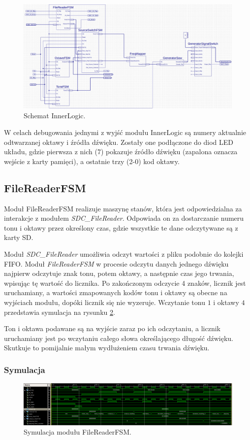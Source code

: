 \documentclass[a4paper,12pt]{article}
\begin{document}
\begin{figure}[h]
  \centering
  \includegraphics[width=\linewidth]{images/inner}
  \caption{Schemat InnerLogic.}
  \label{sch:inner}
\end{figure}

W celach debugowania jednymi z wyjść modułu InnerLogic są numery aktualnie odtwarzanej oktawy i źródła dźwięku. Zostały one podłączone do diod LED układu, gdzie pierwsza z nich (7) pokazuje źródło dźwięku (zapalona oznacza wejście z karty pamięci), a ostatnie trzy (2-0) kod oktawy. 

\subsection{FileReaderFSM}

Moduł FileReaderFSM realizuje maszynę stanów, która jest odpowiedzialna za interakcje z modułem \textit{SDC\_FileReader}. Odpowiada on za dostarczanie numeru tonu i oktawy przez określony czas, gdzie wszystkie te dane odczytywane są z karty SD.

Moduł \textit{SDC\_FileReader} umożliwia odczyt wartości z pliku podobnie do kolejki FIFO. Moduł \textit{FileReaderFSM} w procesie odczytu danych jednego dźwięku najpierw odczytuje znak tonu, potem oktawy, a następnie czas jego trwania, wpisując tę wartość do licznika. Po zakończonym odczycie 4 znaków, licznik jest uruchamiany, a wartości zmapowanych kodów tonu i oktawy są obecne na wyjściach modułu, dopóki licznik się nie wyzeruje. Wczytanie tonu $1$ i oktawy $4$ przedstawia symulacja na rysunku \ref{sim:fileReader}.

Ton i oktawa podawane są na wyjście zaraz po ich odczytaniu, a licznik uruchamiany jest po wczytaniu całego słowa określającego długość dźwięku. Skutkuje to pomijalnie małym wydłużeniem czasu trwania dźwięku.
\subsubsection{Symulacja}
\begin{figure}[h]
  \centering
  \includegraphics[decodearray={1 0 1 0 1 0}, width=\linewidth]{images/filereader}
  \caption{Symulacja modułu FileReaderFSM.}
  \label{sim:fileReader}
\end{figure}
\end{document}
